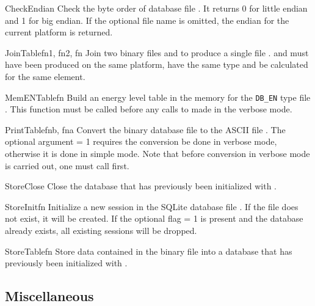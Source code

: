 \begin{fundesc}{CheckEndian}{}
Check the byte order of database file . It returns 0 for little endian
and 1 for big endian. If the optional file name  is omitted, the
endian for the current platform is returned.
\end{fundesc}

\begin{fundesc}{JoinTable}{fn1, fn2, fn}
Join two binary files  and  to produce a single file
.  and  must have been produced on the same
platform, have the same type and be calculated for the same element.
\end{fundesc}

\begin{fundesc}{MemENTable}{fn}
Build an energy level table in the memory for the \texttt{DB\_EN} type file
. This function must be called before any calls to 
made in the verbose mode.
\end{fundesc}

\begin{fundesc}{PrintTable}{fnb, fna}
Convert the binary database file  to the ASCII file . The
optional argument  = 1 requires the conversion be done in verbose
mode, otherwise it is done in simple mode. Note that before conversion in
verbose mode is carried out, one must call  first.
\end{fundesc}

\begin{fundesc}{StoreClose}{}
Close the database that has previously been initialized with
.
\end{fundesc}

\begin{fundesc}{StoreInit}{fn }
Initialize a new session in the SQLite database file . If the file does
not exist, it will be created. If the optional flag  = 1 is present
and the database already exists, all existing sessions will be dropped.
\end{fundesc}

\begin{fundesc}{StoreTable}{fn}
Store data contained in the binary file  into a database that has
previously been initialized with .
\end{fundesc}


\subsection{Miscellaneous}

